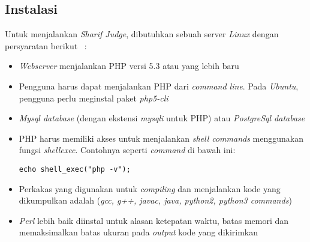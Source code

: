\subsection{Instalasi}
Untuk menjalankan \textit{Sharif Judge}, dibutuhkan sebuah server \textit{Linux} dengan persyaratan berikut ~\cite{mjnaderi:14:sharifjudgedoc}:
\begin{itemize}
	\item \textit{Webserver} menjalankan PHP versi 5.3 atau yang lebih baru
	\item Pengguna harus dapat menjalankan PHP dari \textit{command line}. Pada \textit{Ubuntu}, pengguna perlu meginstal paket \textit{php5-cli}
	\item \textit{Mysql database} (dengan ekstensi \textit{mysqli} untuk PHP) atau \textit{PostgreSql database}
	\item PHP harus memiliki akses untuk menjalankan \textit{shell commands} menggunakan fungsi \textit{shell\textunderscore exec}. Contohnya seperti \textit{command} di bawah ini: 
		\begin{lstlisting}[basicstyle=\ttfamily, frame=single,
columns=fullflexible, keepspaces=true, breaklines=true]
echo shell_exec("php -v");
\end{lstlisting}
	\item Perkakas yang digunakan untuk \textit{compiling} dan menjalankan kode yang dikumpulkan adalah (\textit{gcc, g++, javac, java, python2, python3 commands})
	\item \textit{Perl} lebih baik diinstal untuk alasan ketepatan waktu, batas memori dan memaksimalkan batas ukuran pada \textit{output} kode yang dikirimkan
\end{itemize}


